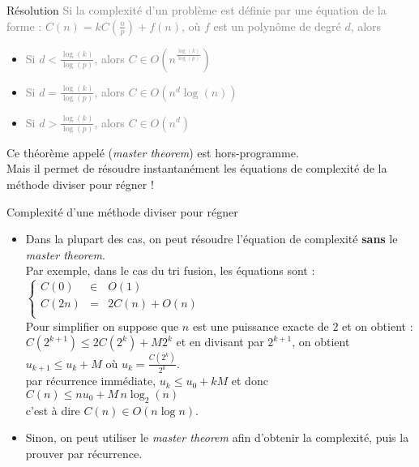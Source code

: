 \documentclass[10pt]{beamer}
\begin{document}
\begin{frame}{\Ctitle}{\stitle}
	\begin{alertblock}{Résolution}
		\onslide<2->\textcolor{gray}{Si la complexité d'un problème est définie par une équation de la forme :
			$ C(n) = k C(\frac{n}{p}) + f(n)$, où $f$ est un polynôme de degré $d$, alors}
		\begin{itemize}
			\item<3->\textcolor{gray}{Si $d < \frac{\log(k)}{\log(p)}$, alors $C \in O(n^\frac{\log(k)}{\log(p)})$}
			\item<4->\textcolor{gray}{Si $d = \frac{\log(k)}{\log(p)}$, alors $C \in O(n^d \log(n))$}
			\item<5->\textcolor{gray}{Si $d > \frac{\log(k)}{\log(p)}$, alors $C \in O(n^d)$}
		\end{itemize}
		\textcolor{BrickRed}{\small \danger} Ce théorème appelé (\textit{master theorem}) est hors-programme. \\
		\onslide<7-> Mais il permet de résoudre instantanément les équations de complexité de la méthode diviser pour régner !
	\end{alertblock}
\end{frame}

\begin{frame}{\Ctitle}{\stitle}
	\begin{block}{Complexité d'une méthode diviser pour régner}
		\begin{itemize}
			\item<1-> Dans la plupart des cas, on peut résoudre l'équation de complexité \textbf{sans} le \textit{master theorem}.\\
				\onslide<2->\textcolor{OliveGreen}{\small Par exemple, dans le cas du tri fusion, les équations sont :
					$\left\{
						\begin{array}{lll}
							C(0)  & \in & O(1)          \\
							C(2n) & =   & 2C(n)  + O(n) \\
						\end{array}
						\right.$}\\
				\onslide<3->\textcolor{OliveGreen}{\small Pour simplifier on suppose que $n$ est une puissance exacte de $2$ et on obtient : $C(2^{k+1}) \leq 2C(2^k) + M2^k$ et en divisant par $2^{k+1}$, on obtient \\}
				\onslide<4->\textcolor{OliveGreen}{\small $u_{k+1} \leq u_{k} + M$ où $u_k = \frac{C(2^k)}{2^k}$.\\}
				\onslide<5->\textcolor{OliveGreen}{\small par récurrence immédiate, $u_{k} \leq u_0 + kM$}
				\onslide<6->\textcolor{OliveGreen}{\small et donc $C(n) \leq n u_0  + M\,n\log_2(n) $\\}
				\onslide<7->\textcolor{OliveGreen}{\small c'est à dire $C(n) \in O(n\log n)$.}
			\item<2-> Sinon, on peut utiliser le \textit{master theorem} afin d'obtenir la complexité, puis la prouver par récurrence.
		\end{itemize}
	\end{block}
\end{frame}
\end{document}
